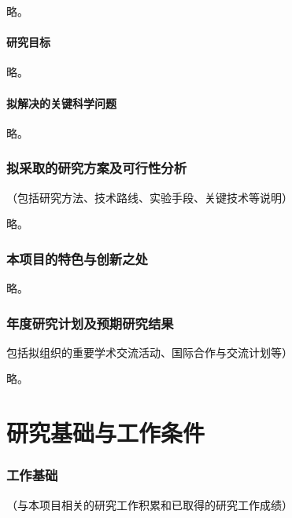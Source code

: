 \documentclass[subfig,boldtoc]{mynsfc}
\begin{document}
略。

\subsection{研究目标}

略。

\subsection{拟解决的关键科学问题}

略。

\section{拟采取的研究方案及可行性分析}
\label{sec:approach}

\begin{hcomment}
  （包括研究方法、技术路线、实验手段、关键技术等说明）
\end{hcomment}

略。

\section{本项目的特色与创新之处}
\label{sec:innovation}

略。

\section{年度研究计划及预期研究结果}
\label{sec:plan}

\begin{hcomment}
  包括拟组织的重要学术交流活动、国际合作与交流计划等）
\end{hcomment}

略。

\part{研究基础与工作条件}
\label{sec:preparation}


\section{工作基础}
\label{sec:previous-work}

\begin{hcomment}
  （与本项目相关的研究工作积累和已取得的研究工作成绩）
\end{hcomment}
\end{document}
